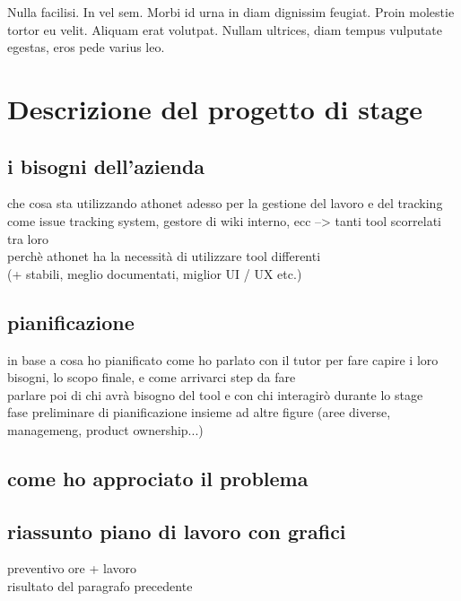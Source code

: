 \begin{savequote}[75mm]
Nulla facilisi. In vel sem. Morbi id urna in diam dignissim feugiat. Proin molestie tortor eu velit. Aliquam erat volutpat. Nullam ultrices, diam tempus vulputate egestas, eros pede varius leo.
\end{savequote}

\chapter{Descrizione del progetto di stage}




\section{i bisogni dell'azienda}
che cosa sta utilizzando athonet adesso per la gestione del lavoro e del tracking\\
come issue tracking system, gestore di wiki interno, ecc --> tanti tool scorrelati tra loro\\
perchè athonet ha la necessità di utilizzare tool differenti \\
(+ stabili, meglio documentati, miglior UI / UX etc.)

\section{pianificazione}
in base a cosa ho pianificato
come ho parlato con il tutor per fare capire i loro bisogni, lo scopo finale, e come arrivarci
step da fare\\
parlare poi di chi avrà bisogno del tool e con chi interagirò durante lo stage\\
fase preliminare di pianificazione insieme ad altre figure (aree diverse, managemeng, product ownership...)

\section{come ho approciato il problema}

\section{riassunto piano di lavoro con grafici}
preventivo ore + lavoro\\
risultato del paragrafo precedente
